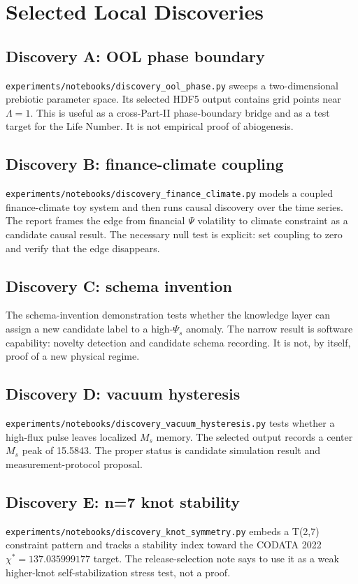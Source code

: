 \documentclass[12pt,a4paper]{article}
\begin{document}
\section{Selected Local Discoveries}
\subsection{Discovery A: OOL phase boundary}
\texttt{experiments/notebooks/discovery\_ool\_phase.py} sweeps a two-dimensional
prebiotic parameter space. Its selected HDF5 output contains grid points near
$\Lambda=1$. This is useful as a cross-Part-II phase-boundary bridge and as a
test target for the Life Number. It is not empirical proof of abiogenesis.

\subsection{Discovery B: finance-climate coupling}
\texttt{experiments/notebooks/discovery\_finance\_climate.py} models a coupled
finance-climate toy system and then runs causal discovery over the time series.
The report frames the edge from financial $\Psi$ volatility to climate
constraint as a candidate causal result. The necessary null test is explicit:
set coupling to zero and verify that the edge disappears.

\subsection{Discovery C: schema invention}
The schema-invention demonstration tests whether the knowledge layer can assign
a new candidate label to a high-$\Psi_s$ anomaly. The narrow result is software
capability: novelty detection and candidate schema recording. It is not, by
itself, proof of a new physical regime.

\subsection{Discovery D: vacuum hysteresis}
\texttt{experiments/notebooks/discovery\_vacuum\_hysteresis.py} tests whether a
high-flux pulse leaves localized $M_s$ memory. The selected output records a
center $M_s$ peak of 15.5843. The proper status is candidate simulation result
and measurement-protocol proposal.

\subsection{Discovery E: n=7 knot stability}
\texttt{experiments/notebooks/discovery\_knot\_symmetry.py} embeds a T(2,7)
constraint pattern and tracks a stability index toward the CODATA 2022
$\chi^*=137.035999177$ target. The release-selection note says to use it as a
weak higher-knot self-stabilization stress test, not a proof.
\end{document}
